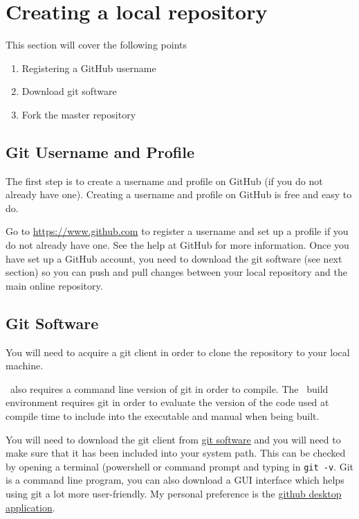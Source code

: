 \section{Creating a local repository\label{sec:local_repo}}

This section will cover the following points

\begin{enumerate}
	\item Registering a GitHub username
	\item Download git software
	\item Fork the master repository
\end{enumerate}

\subsection{Git Username and Profile}

The first step is to create a username and profile on GitHub (if you do not already have one). Creating a username and profile on GitHub is free and easy to do. 

Go to \url{https://www.github.com} to register a username and set up a profile if you do not already have one. See the help at GitHub for more information. Once you have set up a GitHub account, you need to download the git software (see next section) so you can push and pull changes between your local repository and the main online repository.

\subsection{Git Software}

You will need to acquire a git client in order to clone the repository to your local machine.

\CNAME\ also requires a command line version of git in order to compile. The \CNAME\ build environment requires git in order to evaluate the version of the code used at compile time to include into the executable and manual when being built. 

You will need to download the git client from \href{https://git-scm.com/downloads}{git software} and you will need to make sure that it has been included into your system path. This can be checked by opening a terminal (powershell or command prompt and typing in \texttt{git -v}. Git is a command line program, you can also download a GUI interface which helps using git a lot more user-friendly. My personal preference is the \href{https://desktop.github.com/}{github desktop application}. 

